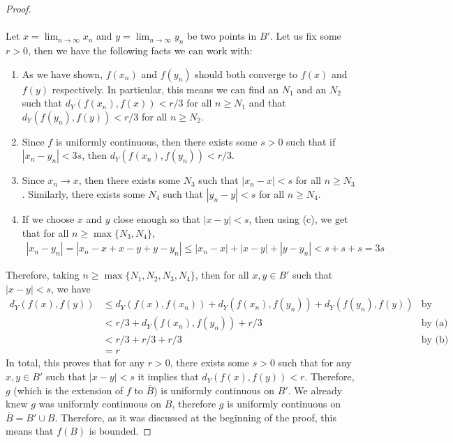\documentclass[10pt,a4paper]{article}
\theoremstyle{definition}
\theoremstyle{definition}
\numberwithin{equation}{section}
\begin{document}
\begin{proof}
\\
\\Let $x = \lim_{n \to \infty} x_n$ and $y = \lim_{n \to \infty} y_n$ be two points in $B'$. Let us fix some $r > 0$, then we have the following facts we can work with:
\begin{enumerate}[label = (\alph*)]
\item As we have shown, $f(x_n)$ and $f(y_n)$ should both converge to $f(x)$ and $f(y)$ respectively. In particular, this means we can find an $N_1$ and an $N_2$ such that $d_Y(f(x_n), f(x)) < r/3$ for all $n \geq N_1$ and that $d_Y(f(y_n), f(y)) < r/3$ for all $n \geq N_2$.
\item Since $f$ is uniformly continuous, then there exists some $s > 0$ such that if $|x_n - y_n| < 3s$, then $d_Y(f(x_n), f(y_n)) < r/3$. 
\item Since $x_n \to x$, then there exists some $N_3$ such that $|x_n - x| < s$ for all $n \geq N_3$. Similarly, there exists some $N_4$ such that $|y_n - y| < s$ for all $n \geq N_4$. 
\item If we choose $x$ and $y$ close enough so that $|x - y| < s$, then using (c), we get that for all $n \geq \max\{N_3, N_4\}$,
\begin{align*}
|x_n - y_n| = |x_n - x + x - y + y - y_n| \leq |x_n - x| + |x - y| + |y - y_n| < s + s + s = 3s
\end{align*}
\end{enumerate}
Therefore, taking $n \geq \max\{N_1, N_2, N_3, N_4\}$, then for all $x, y \in B'$ such that $|x - y| < s$, we have
\begin{align*}
d_Y(f(x), f(y)) &\leq d_Y(f(x), f(x_n)) + d_Y(f(x_n), f(y_n)) + d_Y(f(y_n), f(y)) &\text{by Triangle Inequality}\\
&< r/3 + d_Y(f(x_n), f(y_n)) + r/3 &\text{by (a)}\\
&< r/3 + r/3 + r/3 &\text{by (b) since we have (d)}\\
&= r
\end{align*}
In total, this proves that for any $r > 0$, there exists some $s > 0$ such that for any $x, y \in B'$ such that $|x - y| < s$ it implies that $d_Y(f(x), f(y)) < r$. Therefore, $g$ (which is the extension of $f$ to $\overline{B}$) is uniformly continuous on $B'$. We already knew $g$ was uniformly continuous on $B$, therefore $g$ is uniformly continuous on $\overline{B} = B' \cup B$. Therefore, as it was discussed at the beginning of the proof, this means that $f(B)$ is bounded. 
\end{proof}
\end{document}
